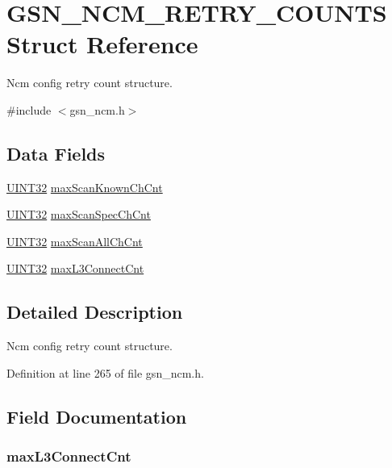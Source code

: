 \hypertarget{a00161}{
\section{GSN\_\-NCM\_\-RETRY\_\-COUNTS Struct Reference}
\label{a00161}
}


Ncm config retry count structure.  




{\ttfamily \#include $<$gsn\_\-ncm.h$>$}

\subsection*{Data Fields}
\begin{DoxyCompactItemize}
\item 
\hyperlink{a00660_gae1e6edbbc26d6fbc71a90190d0266018}{UINT32} \hyperlink{a00161_ad361089d17f0839dacdf9c914a6cffc6}{maxScanKnownChCnt}
\item 
\hyperlink{a00660_gae1e6edbbc26d6fbc71a90190d0266018}{UINT32} \hyperlink{a00161_a40d4d12f85e32539a445513954beb0b2}{maxScanSpecChCnt}
\item 
\hyperlink{a00660_gae1e6edbbc26d6fbc71a90190d0266018}{UINT32} \hyperlink{a00161_a9ac27e73f1305dafb17c2ad990126582}{maxScanAllChCnt}
\item 
\hyperlink{a00660_gae1e6edbbc26d6fbc71a90190d0266018}{UINT32} \hyperlink{a00161_abc1fde9c9e46192c556c037ac94880b0}{maxL3ConnectCnt}
\end{DoxyCompactItemize}


\subsection{Detailed Description}
Ncm config retry count structure. 

Definition at line 265 of file gsn\_\-ncm.h.



\subsection{Field Documentation}
\hypertarget{a00161_abc1fde9c9e46192c556c037ac94880b0}{
\subsubsection[{maxL3ConnectCnt}]{ {\bf maxL3ConnectCnt}}}
\label{a00161_abc1fde9c9e46192c556c037ac94880b0}


